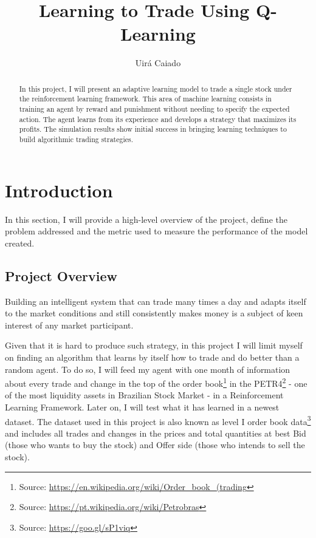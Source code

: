 \documentclass[a4paper]{article}
\title{Learning to Trade Using Q-Learning}
\author{Uirá Caiado}
\begin{document}
\maketitle

\begin{abstract}
In this project, I will present an adaptive learning model to trade a single stock under the reinforcement learning framework. This area of machine learning consists in training an agent by reward and punishment without needing to specify the expected action. The agent learns from its experience and develops a strategy that maximizes its profits. The simulation results show initial success in bringing learning techniques to build algorithmic trading strategies.
\end{abstract}


\section{Introduction}
\label{sec:introduction}

In this section, I will provide a high-level overview of the project, define the problem addressed and the metric used to measure the performance of the model created.

\subsection{Project Overview}
Building an intelligent system that can trade many times a day and adapts itself to the market conditions and still consistently makes money is a subject of keen interest of any market participant.

Given that it is hard to produce such strategy, in this project I will limit myself on finding an algorithm that learns by itself how to trade and do better than a random agent. To do so, I will feed my agent with one month of information about every trade and change in the top of the order book\footnote{Source: \url{https://en.wikipedia.org/wiki/Order_book_(trading}} in the PETR4\footnote{Source: \url{https://pt.wikipedia.org/wiki/Petrobras}} - one of the most liquidity assets in Brazilian Stock Market - in a Reinforcement Learning Framework. Later on, I will test what it has learned in a newest dataset. The dataset used in this project is also known as level I order book data\footnote{Source: \url{https://goo.gl/sP1viq}} and includes all trades and changes in the prices and total quantities at best Bid (those who wants to buy the stock) and Offer side (those who intends to sell the stock).
\end{document}
